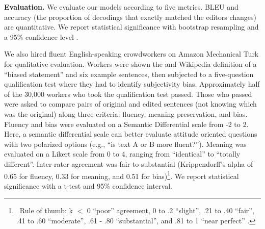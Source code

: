 \textbf{Evaluation.} We evaluate our models according to five metrics. BLEU \cite{papineni2002bleu} and accuracy (the proportion of decodings that exactly matched the editors changes) are quantitative. We report statistical significance with bootstrap resampling and a 95\% confidence level  \cite{koehn2004statistical,efron1994introduction}.

We also hired fluent English-speaking crowdworkers on Amazon Mechanical Turk for qualitative evaluation. Workers were shown the \citet{recasens2013linguistic} and Wikipedia definition of a ``biased statement'' and six example sentences, then subjected to a five-question qualification test where they had to identify subjectivity bias. Approximately half of the 30,000 workers who took the qualification test passed. Those who passed were asked to compare pairs of original and edited sentences (not knowing which was the original) along three criteria: fluency, meaning preservation, and bias. Fluency and bias were evaluated on a Semantic Differential scale from -2 to 2. Here, a semantic differential scale can better evaluate attitude oriented questions with two polarized options (e.g., ``is text A or B more fluent?''). 
Meaning was evaluated on a Likert scale from 0 to 4, ranging from ``identical'' to ``totally different''. Inter-rater agreement was fair to substantial (Krippendorff's alpha of 0.65 for fluency, 0.33 for meaning, and 0.51 for bias)\footnote{\ Rule of thumb: k $<$ 0 ``poor'' agreement, 0 to .2 ``slight'', .21 to .40 ``fair'', .41 to .60 ``moderate'', .61 - .80 ``substantial'', and .81 to 1 ``near perfect'' \cite{gwet2011krippendorff}.}. We report statistical significance with a t-test and 95\% confidence interval.


